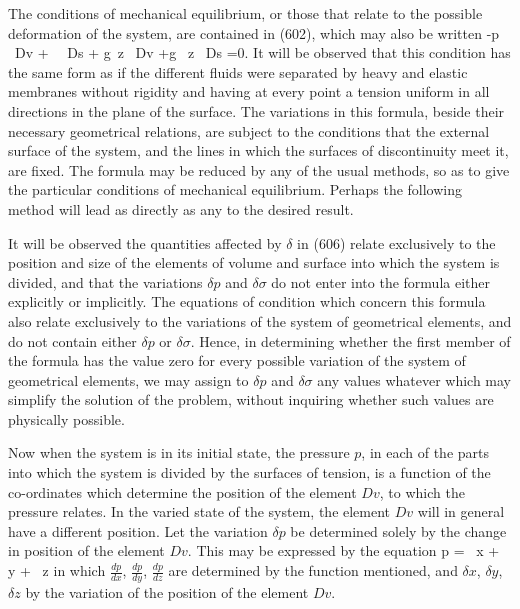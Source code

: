 \documentclass[12pt]{memoir}
\newcommand{\dd}{\delta}
\begin{document}
The conditions of mechanical equilibrium, or those that relate to the possible deformation of the system, are contained in (602), which may also be written
\eqs -\int p \, \dd \, Dv + \int \sigma \, \dd \, Ds + \int g\gamma \, \dd z \, Dv +\int g \Gamma\, \dd z \, Ds =0.   \label{606} \eqe
It will be observed that this condition has the same form as if the different fluids were separated by heavy and elastic membranes without rigidity and having at every point a tension uniform in all directions in the plane of the surface. The variations in this formula, beside their necessary geometrical relations, are subject to the conditions that the external surface of the system, and the lines in which the surfaces of discontinuity meet it, are fixed. The formula may be reduced by any of the usual methods, so as to give the particular conditions of mechanical equilibrium. Perhaps the following method will lead as directly as any to the desired result.

It will be observed the quantities affected by $\dd$ in (606) relate exclusively to the position and size of the elements of volume and surface into which the system is divided, and that the variations $\dd p$ and $\dd \sigma$ do not enter into the formula either explicitly or implicitly. The equations of condition which concern this formula also relate exclusively to the variations of the system of geometrical elements, and do not contain either $\dd p$ or $\dd \sigma$. Hence, in determining whether the first member of the formula has the value zero for every possible variation of the system of geometrical elements, we may assign to $\dd p$ and $\dd \sigma$ any values whatever which may simplify the solution of the problem, without inquiring whether such values are physically possible.

Now when the system is in its initial state, the pressure $p$, in each of the parts into which the system is divided by the surfaces of tension, is a function of the co-ordinates which determine the position of the element $Dv$, to which the pressure relates. In the varied state of the system, the element $Dv$ will in general have a different position. Let the variation $\dd p$ be determined solely by the change in position of the element $Dv$. This may be expressed by the equation
\eqs \dd p = \, \dd x + \, \dd y + \, \dd z \label{607} \eqe
in which $\frac{dp}{dx}$, $\frac{dp}{dy}$, $\frac{dp}{dz}$ are determined by the function mentioned, and $\dd x$, $\dd y$, $\dd z$ by the variation of the position of the element $Dv$.
\end{document}
